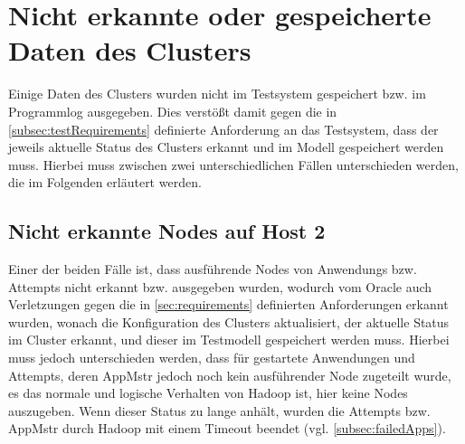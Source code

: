 \section{Nicht erkannte oder gespeicherte Daten des Clusters}
\label{sec:notDetectedData}

Einige Daten des Clusters wurden nicht im Testsystem gespeichert bzw. im Programmlog ausgegeben.
Dies verstößt damit gegen die in \cref{subsec:testRequirements} definierte Anforderung an das Testsystem, dass der jeweils aktuelle Status des Clusters erkannt und im Modell gespeichert werden muss.
Hierbei muss zwischen zwei unterschiedlichen Fällen unterschieden werden, die im Folgenden erläutert werden.

\subsection{Nicht erkannte Nodes auf Host 2}
\label{subsec:notDetectedHost2}

Einer der beiden Fälle ist, dass ausführende Nodes von \glspl{Anwendung} bzw. \glspl{Attempt} nicht erkannt bzw. ausgegeben wurden, wodurch vom Oracle auch Verletzungen gegen die in \cref{sec:requirements} definierten Anforderungen erkannt wurden, wonach die Konfiguration des Clusters aktualisiert, der aktuelle Status im Cluster erkannt, und dieser im Testmodell gespeichert werden muss.
Hierbei muss jedoch unterschieden werden, dass für gestartete Anwendungen und Attempts, deren \gls{AppMstr} jedoch noch kein ausführender Node zugeteilt wurde, es das normale und logische Verhalten von Hadoop ist, hier keine Nodes auszugeben.
Wenn dieser Status zu lange anhält, wurden die \glspl{Attempt} bzw. \gls{AppMstr} durch Hadoop mit einem Timeout beendet (vgl. \cref{subsec:failedApps}).

